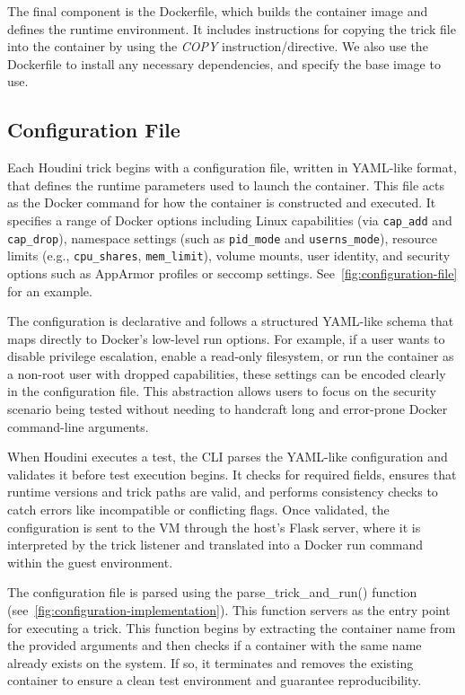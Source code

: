 \documentclass[12pt]{report}
\begin{document}
\begin{doublespace}
The final component is the Dockerfile, which builds the container image and defines the runtime environment. It includes instructions for copying the trick file into the container by using the \textit{COPY} instruction/directive. We also use the Dockerfile to install any necessary dependencies, and specify the base image to use.

\subsection{Configuration File}
\label{sec:configuration}

Each Houdini trick begins with a configuration file, written in YAML-like format, that defines the runtime parameters used to launch the container. This file acts as the Docker command for how the container is constructed and executed. It specifies a range of Docker options including Linux capabilities (via \texttt{cap\_add} and \texttt{cap\_drop}), namespace settings (such as \texttt{pid\_mode} and \texttt{userns\_mode}), resource limits (e.g., \texttt{cpu\_shares}, \texttt{mem\_limit}), volume mounts, user identity, and security options such as AppArmor profiles or seccomp settings. See~\ref{fig:configuration-file} for an example.

The configuration is declarative and follows a structured YAML-like schema that maps directly to Docker’s low-level run options. For example, if a user wants to disable privilege escalation, enable a read-only filesystem, or run the container as a non-root user with dropped capabilities, these settings can be encoded clearly in the configuration file. This abstraction allows users to focus on the security scenario being tested without needing to handcraft long and error-prone Docker command-line arguments.

When Houdini executes a test, the CLI parses the YAML-like configuration and validates it before test execution begins. It checks for required fields, ensures that runtime versions and trick paths are valid, and performs consistency checks to catch errors like incompatible or conflicting flags. Once validated, the configuration is sent to the VM through the host’s Flask server, where it is interpreted by the trick listener and translated into a Docker run command within the guest environment. 

The configuration file is parsed using the parse\_trick\_and\_run() function (see~\ref{fig:configuration-implementation}). This function servers as the entry point for executing a trick. This function begins by extracting the container name from the provided arguments and then checks if a container with the same name already exists on the system. If so, it terminates and removes the existing container to ensure a clean test environment and guarantee reproducibility.


\end{doublespace}
\end{document}
